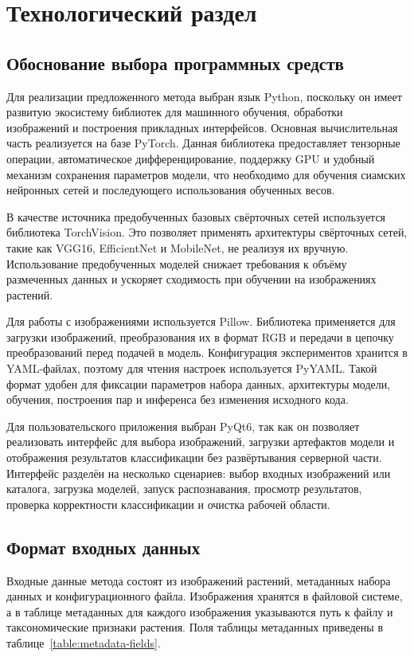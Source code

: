 \chapter{Технологический раздел}

\section{Обоснование выбора программных средств}
Для реализации предложенного метода выбран язык Python, поскольку он имеет развитую экосистему библиотек для машинного обучения, обработки изображений и построения прикладных интерфейсов. Основная вычислительная часть реализуется на базе PyTorch. Данная библиотека предоставляет тензорные операции, автоматическое дифференцирование, поддержку GPU и удобный механизм сохранения параметров модели, что необходимо для обучения сиамских нейронных сетей и последующего использования обученных весов.

В качестве источника предобученных базовых свёрточных сетей используется библиотека TorchVision. Это позволяет применять архитектуры свёрточных сетей, такие как VGG16, EfficientNet и MobileNet, не реализуя их вручную. Использование предобученных моделей снижает требования к объёму размеченных данных и ускоряет сходимость при обучении на изображениях растений.

Для работы с изображениями используется Pillow. Библиотека применяется для загрузки изображений, преобразования их в формат RGB и передачи в цепочку преобразований перед подачей в модель. Конфигурация экспериментов хранится в YAML-файлах, поэтому для чтения настроек используется PyYAML. Такой формат удобен для фиксации параметров набора данных, архитектуры модели, обучения, построения пар и инференса без изменения исходного кода.

Для пользовательского приложения выбран PyQt6, так как он позволяет реализовать интерфейс для выбора изображений, загрузки артефактов модели и отображения результатов классификации без развёртывания серверной части. Интерфейс разделён на несколько сценариев: выбор входных изображений или каталога, загрузка моделей, запуск распознавания, просмотр результатов, проверка корректности классификации и очистка рабочей области.

\section{Формат входных данных}
Входные данные метода состоят из изображений растений, метаданных набора данных и конфигурационного файла. Изображения хранятся в файловой системе, а в таблице метаданных для каждого изображения указываются путь к файлу и таксономические признаки растения. Поля таблицы метаданных приведены в таблице~\ref{table:metadata-fields}.

